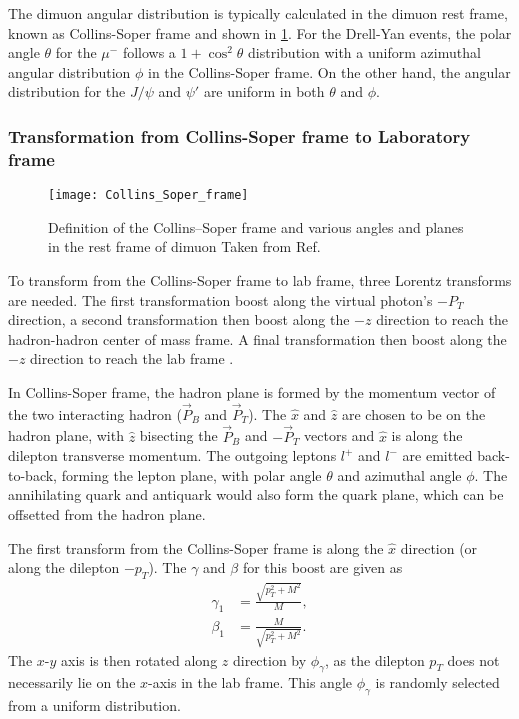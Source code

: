 \documentclass[../main.tex]{subfiles}
\begin{document}
The dimuon angular distribution is typically calculated in the dimuon rest frame, known as
Collins-Soper frame \cite{collins1977} and shown in \cref{fig:cs_frame}.
For the Drell-Yan events, the polar angle $\theta$ for the $\mu^-$ follows
a $1+\cos^2\theta$ distribution with a uniform azimuthal angular distribution $\phi$ in the Collins-Soper frame.
On the other hand, the angular distribution for the $J/\psi$ and $\psi'$ are uniform in
both $\theta$ and $\phi$.

\subsubsection{Transformation from Collins-Soper frame to Laboratory frame}
\begin{figure}[h!]
	\centering
	\texttt{[image: Collins\_Soper\_frame]}
	\caption{Definition of the Collins–Soper frame and various angles and planes in the rest frame of dimuon
		Taken from Ref.~\cite{peng2019}}
	\label{fig:cs_frame}
\end{figure}
To transform from the Collins-Soper frame to lab frame, three Lorentz transforms are needed.
The first transformation boost along the virtual photon's $-P_T$ direction, a second transformation then
boost along the $-z$ direction to reach the hadron-hadron center of mass frame. A final transformation
then boost along the $-z$ direction to reach the lab frame \cite{Don-1926}.

In Collins-Soper frame, the hadron plane is formed by the momentum vector of the two interacting hadron
($\vec{P}_B$ and $\vec{P}_T$). The $\hat{x}$ and $\hat{z}$ are chosen to be on the hadron plane, with
$\hat{z}$ bisecting the $\vec{P}_B$ and $-\vec{P}_T$ vectors and $\hat{x}$ is along the dilepton transverse
momentum. The outgoing leptons $l^+$ and $l^-$ are
emitted back-to-back, forming the lepton plane, with polar angle $\theta$ and azimuthal angle $\phi$.
The annihilating quark and antiquark would also form the quark plane, which can be offsetted from the
hadron plane.

The first transform from the Collins-Soper frame is along the $\hat{x}$ direction (or along the dilepton $-p_T$). The $\gamma$ and $\beta$ for this boost are given as
\begin{equation}
	\begin{split}
		\gamma_1 & = \frac{\sqrt{p_T^2 + M^2}}{M},\\
		\beta_1 & = \frac{M}{\sqrt{p_T^2 + M^2}}.
	\end{split}
\end{equation}
The $x$-$y$ axis is then rotated along $z$ direction by $\phi_\gamma$, as the dilepton $p_T$
does not necessarily lie on the $x$-axis in the lab frame.
This angle $\phi_\gamma$ is randomly selected from a uniform distribution.
\end{document}
